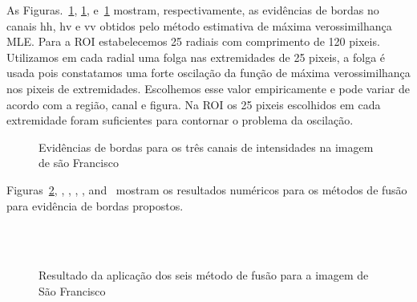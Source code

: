 As Figuras.~\ref{evidencias_sf_hh_hv_vv}, \ref{evidencias_sf_hh_hv_vv}, e~\ref{evidencias_sf_hh_hv_vv} mostram, respectivamente, as evidências de bordas no canais $\text{hh}$, $\text{hv}$ e $\text{vv}$ obtidos pelo método estimativa de máxima verossimilhança MLE. Para a ROI estabelecemos 25 radiais com comprimento de 120 pixeis. Utilizamos em cada radial uma folga nas extremidades de  25 pixeis, a folga é usada pois constatamos uma forte oscilação da função de máxima verossimilhança nos pixeis de extremidades. Escolhemos esse valor empiricamente e pode variar de acordo com a região, canal e figura. Na ROI os 25 pixeis escolhidos em cada extremidade foram suficientes para contornar o problema  da oscilação.
\begin{figure}[H]
	\centering
     \caption{Evidências de bordas para os três canais de intensidades na imagem de são Francisco}
     \label{evidencias_sf_hh_hv_vv} 
\end{figure}

Figuras~\ref{fusion_sf_met}, , , , , and~ mostram os resultados numéricos para os métodos de fusão para evidência de bordas propostos. 
\begin{figure}[htb]
	\centering
     \\
     \\
     \caption{Resultado da aplicação dos seis método de fusão para a imagem de São Francisco}
     \label{fusion_sf_met}
\end{figure}

